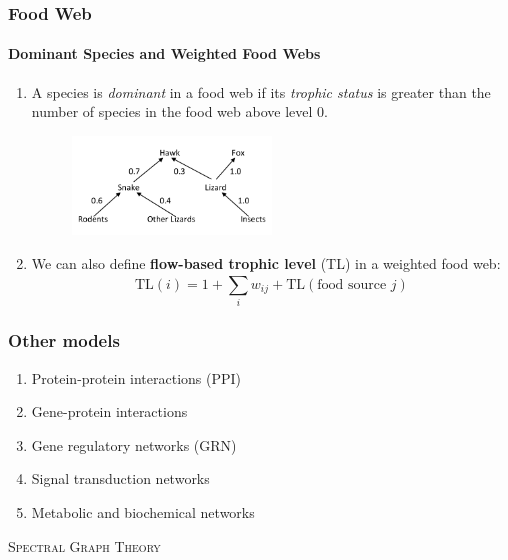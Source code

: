\documentclass[aspectratio=43,leqno]{beamer}
\begin{document}
\begin{frame}
  \frametitle{Food Web}
  \framesubtitle{Dominant Species and Weighted Food Webs}
  
\begin{enumerate}
\item\label{item:13} A species is\emph{ dominant} in a food web if its \emph{trophic status} is greater than the number of species in the food web above level $0$. \pause
    \begin{figure}[h]
    \centering
    \includegraphics[width=0.5\textwidth]{images/weighted-food-web.png}
    \label{fig:mesh1}
  \end{figure} \pause
\item\label{item:14} We can also define \textbf{flow-based trophic level} (TL) in a weighted food web: 
\begin{displaymath}
\text{TL}(i) = 1 + \sum_i^{} w_{ij} + \text{TL}(\text{food source } j)
\end{displaymath}
\end{enumerate}
  
\end{frame}

\begin{frame}
  \frametitle{Other models}
\begin{enumerate}
\item\label{item:15} Protein-protein interactions (PPI) 
\item\label{item:16} Gene-protein interactions 
\item\label{item:25} Gene regulatory networks (GRN)
\item\label{item:26} Signal transduction networks 
\item\label{item:27} Metabolic and biochemical networks
\end{enumerate}
\end{frame}


\begin{frame}
  \vfill
\begin{center}
 \textsc{Spectral Graph Theory}
\end{center}
  \vfill
\end{frame}
\end{document}
